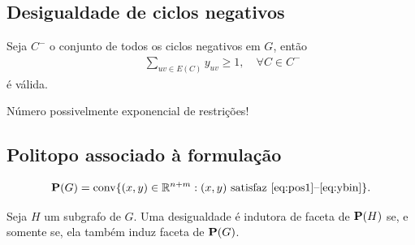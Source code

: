 \documentclass[
12pt,notheorems,hyperref={pdfauthor=whatever}
]{beamer}
\begin{document}
\subsection{Desigualdade de ciclos negativos}
\begin{frame}
    Seja $C^-$ o conjunto de todos os ciclos negativos em $G$, então
    \vspace{1em}
    \begin{align}
		\qquad \sum_{uv \in E(C)} y_{uv} \geq 1,\quad\forall C \in C^- \label{NEC}
	\end{align}
    é válida.

    \pause
    \vspace{1em}
    {\alert{Número possivelmente exponencial de restrições!}}
    
\end{frame}

\subsection{Politopo associado à formulação}
\begin{frame}
    \begin{equation*}
        \mathbf{P}(G) = \mathrm{conv}\{(x,y) \in \mathbb{R}^{n+m} : (x,y) \text{ satisfaz \eqref{eq:pos1}--\eqref{eq:ybin}} \}.
    \end{equation*}
    \pause



    \begin{lemma}\label{lem:sub-ind}
        Seja $H$ um subgrafo de $G$. Uma desigualdade é indutora de faceta de $\mathbf{P}(H)$ se, e somente se, ela também induz faceta de $\mathbf{P}(G)$.\\[1em]
    \end{lemma}
        
\end{frame}
\end{document}

